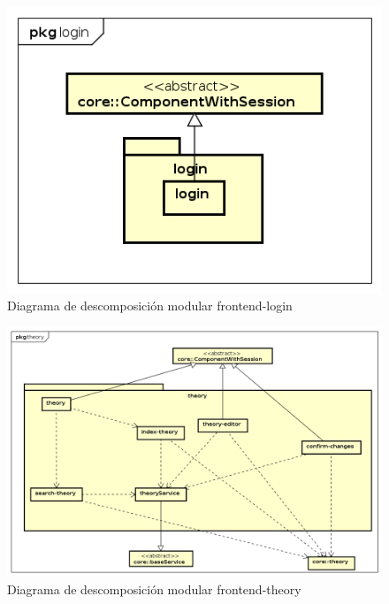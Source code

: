 \documentclass[openright,twoside,10pt]{book}
\begin{document}
    \vspace*{\fill} \newpage
    
    \vspace*{\fill}
    
    \begin{figure}[H]
        \begin{center}
            \includegraphics[width=\textwidth]{img/astah/disenio/descomposicion/front/login.png}
        \end{center}
        \caption{Diagrama de descomposición modular frontend-login}
    \end{figure}
    
    \vspace*{\fill} \newpage
    
    \vspace*{\fill}
    
    \begin{figure}[H]
        \begin{center}
            \includegraphics[width=\textwidth]{img/astah/disenio/descomposicion/front/theory.png}
        \end{center}
        \caption{Diagrama de descomposición modular frontend-theory}
    \end{figure}
    
\end{document}
